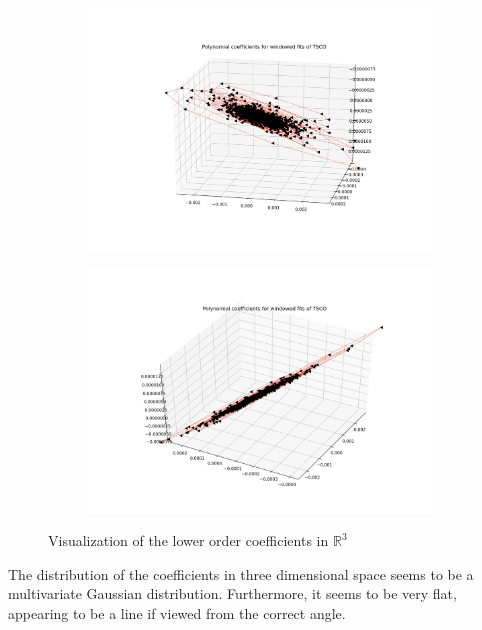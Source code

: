 \documentclass[final]{article}
\begin{document}
\begin{figure}[H]
  \centering
  \begin{subfigure}{.45\textwidth}
    \centering
    \includegraphics[width=\linewidth]{img/coeff1}
  \end{subfigure}
  \begin{subfigure}{.45\textwidth}
    \centering
    \includegraphics[width=\linewidth]{img/coeff2}
  \end{subfigure}
  \caption{Visualization of the lower order coefficients in $\mathbb{R}^3$}
  \label{fig:coeff}
\end{figure}

The distribution of the coefficients in three dimensional space seems
to be a multivariate Gaussian distribution. Furthermore, it seems to
be very flat, appearing to be a line if viewed from the correct angle.
\end{document}
